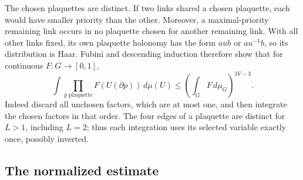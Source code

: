 The chosen plaquettes are distinct. If two links shared a chosen
plaquette, each would have smaller priority than the other. Moreover,
a maximal-priority remaining link occurs in no plaquette chosen for
another remaining link. With all other links fixed, its own plaquette
holonomy has the form $aub$ or $au^{-1}b$, so its distribution is Haar.
Fubini and descending induction therefore show that for continuous
$F:G\to[0,1]$,
\begin{equation}\label{eq:rank-plaquette-elimination}
 \int \prod_{p\text{ plaquette}}F(U(\partial p))\,d\mu(U)
       \le\left(\int_GF\,d\mu_G\right)^{3V-3}.
\end{equation}
Indeed discard all unchosen factors, which are at most one, and then
integrate the chosen factors in that order. The four edges of a
plaquette are distinct for $L>1$, including $L=2$; thus each integration
uses its selected variable exactly once, possibly inverted.

\subsection{The normalized estimate}

